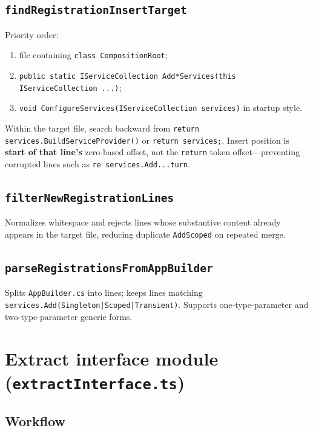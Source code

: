 \subsection{\texttt{findRegistrationInsertTarget}}

Priority order:
\begin{enumerate}
	\item file containing \texttt{class CompositionRoot};
	\item \texttt{public static IServiceCollection Add*Services(this IServiceCollection ...)};
	\item \texttt{void ConfigureServices(IServiceCollection services)} in startup style.
\end{enumerate}

Within the target file, search backward from \texttt{return services.BuildServiceProvider()} or \texttt{return services;}. Insert position is \textbf{start of that line's} zero-based offset, not the \texttt{return} token offset---preventing corrupted lines such as \texttt{re services.Add...turn}.

\subsection{\texttt{filterNewRegistrationLines}}

Normalizes whitespace and rejects lines whose substantive content already appears in the target file, reducing duplicate \texttt{AddScoped} on repeated merge.

\subsection{\texttt{parseRegistrationsFromAppBuilder}}

Splits \texttt{AppBuilder.cs} into lines; keeps lines matching \texttt{services.Add(Singleton|Scoped|Transient)}. Supports one-type-parameter and two-type-parameter generic forms.

\section{Extract interface module (\texttt{extractInterface.ts})}
\label{chap4:extract-interface}

\subsection{Workflow}


